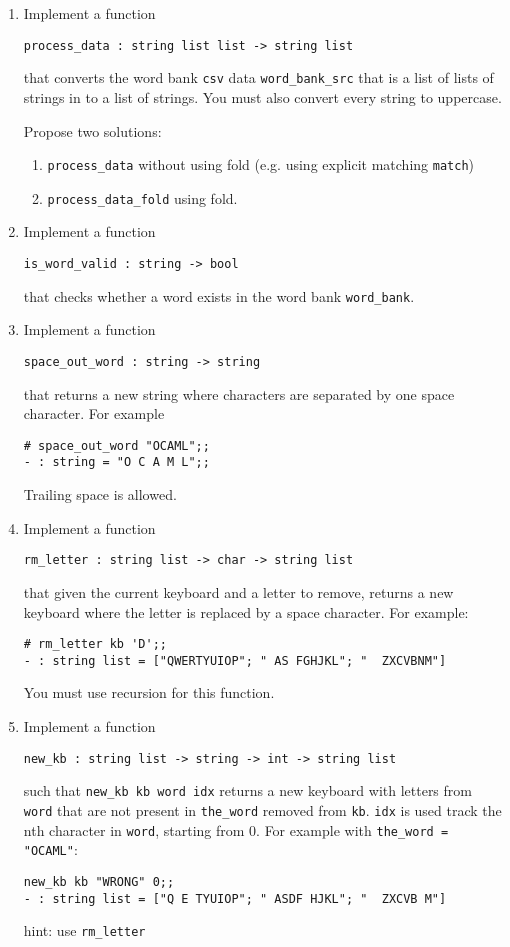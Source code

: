 \documentclass{article}
\newcommand{\code}[1]{\lstinline!#1!}
\begin{document}
\begin{enumerate}
\item Implement a function 
  \begin{center}
    \code{process_data : string list list -> string list}
  \end{center}
 that converts the word bank \code{csv} data \code{word_bank_src} that is a list of lists of strings in to a list of strings. You must also convert every string to uppercase.

Propose two solutions:
\begin{enumerate}
\item \code{process_data} without using fold (e.g. using explicit matching \code{match})

\item   \code{process_data_fold} using fold. 
\end{enumerate}
 

\item Implement a function 
  \begin{center}
    \code{is_word_valid : string -> bool}
  \end{center}
 that checks whether a word exists in the word bank \code{word_bank}. 


\item Implement a function 
  \begin{center}
    \code{space_out_word : string -> string}
  \end{center}
that returns a new string where characters are separated by one space character. 
For example
\begin{lstlisting}
# space_out_word "OCAML";;
- : string = "O C A M L";;
\end{lstlisting}
Trailing space is allowed.
 

\item Implement a function

  \begin{center}
    \code{rm_letter : string list -> char -> string list}
  \end{center}
that given the current keyboard and a letter to remove, returns a new keyboard where the letter is replaced by a space character. For example:
\begin{lstlisting}
# rm_letter kb 'D';;
- : string list = ["QWERTYUIOP"; " AS FGHJKL"; "  ZXCVBNM"]
\end{lstlisting}
You must use recursion for this function.


\item Implement a function
  \begin{center}
    \code{new_kb : string list -> string -> int -> string list}
  \end{center}
such that \code{new_kb kb word idx} returns a new keyboard with letters from \code{word} that are not present in \code{the_word} removed from \code{kb}. \code{idx} is used track the nth character in \code{word}, starting from 0. For example with \code{the_word = "OCAML"}:
\begin{lstlisting}
new_kb kb "WRONG" 0;;
- : string list = ["Q E TYUIOP"; " ASDF HJKL"; "  ZXCVB M"]
\end{lstlisting}
hint: use \code{rm_letter}


\end{enumerate}
\end{document}
